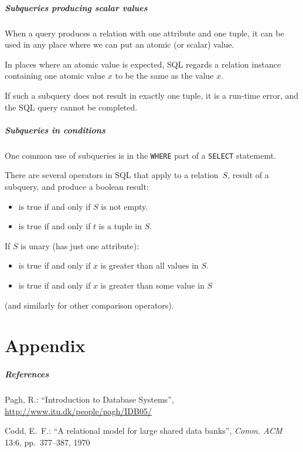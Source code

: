 \documentclass[english,serif,mathserif]{beamer}
\begin{document}
\begin{frame}
  \frametitle{Subqueries producing scalar values}

  When a query produces a relation with one attribute and one tuple, it can
  be used in any place where we can put an atomic (or scalar) value.

  \+ In places where an atomic value is expected, SQL regards a relation
  instance containing one atomic value
  $x$ to be the same as the value $x$.

  \+
  If such a subquery does not result in exactly one tuple, it is a run-time
  error, and the SQL query cannot be completed.
\end{frame}


\begin{frame}
  \frametitle{Subqueries in conditions}
  \small

  One common use of subqueries is in the \texttt{WHERE} part of
  a \texttt{SELECT} statememt.

  \+ There are several operators in SQL that apply to a
  relation~$S$, result of a subquery, and produce a boolean result:
  \begin{itemize}
  \item {} is true if and only if $S$ is not empty.
  \item {} is true if and only if $t$ is a tuple in $S$.
  \end{itemize}

  \+ If $S$ is unary (has just one attribute):
  \begin{itemize}
  \item {} is true if and only if $x$ is greater than all
    values in $S$.
  \item {} is true if and only if $x$ is greater
    than some value in $S$
  \end{itemize}
  (and similarly for other comparison operators).
\end{frame}


\part{Appendix}
\begin{frame}
  \frametitle{References}

  Pagh, R.: ``Introduction to Database Systems'',
  \url{http://www.itu.dk/people/pagh/IDB05/}

  \+
  Codd, E.~F.: ``A relational model for large shared data banks'', \emph{Comm.
  ACM} 13:6, pp.~377--387, 1970
\end{frame}
\end{document}
